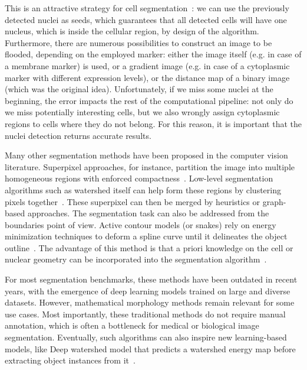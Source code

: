 This is an attractive strategy for cell segmentation~\cite{Wahlby2002}: we can use the previously detected nuclei as seeds, which guarantees that all detected cells will have one nucleus, which is inside the cellular region, by design of the algorithm. Furthermore, there are numerous possibilities to construct an image to be flooded, depending on the employed marker: either the image itself (e.g. in case of a membrane marker) is used, or a gradient image (e.g. in case of a cytoplasmic marker with different expression levels), or the distance map of a binary image (which was the original idea). 
Unfortunately, if we miss some nuclei at the beginning, the error impacts the rest of the computational pipeline: not only do we miss potentially interesting cells, but we also wrongly assign cytoplasmic regions to cells where they do not belong.
For this reason, it is important that the nuclei detection returns accurate results.

Many other segmentation methods have been proposed in the computer vision literature.
Superpixel approaches, for instance, partition the image into multiple homogeneous regions with enforced compactness~\cite{Ren_2003}.
Low-level segmentation algorithms such as watershed itself can help form these regions by clustering pixels together~\cite{Machairas_2014}.
These superpixel can then be merged by heuristics or graph-based approaches. 
The segmentation task can also be addressed from the boundaries point of view.
Active contour models (or snakes) rely on energy minimization techniques to deform a spline curve until it delineates the object outline~\cite{kass_snakes_1988}. The advantage of this method is that a priori knowledge on the cell or nuclear geometry can be incorporated into the segmentation algorithm~\cite{Dufour2005}. 


For most segmentation benchmarks, these methods have been outdated in recent years, with the emergence of deep learning models trained on large and diverse datasets.
However, mathematical morphology methods remain relevant for some use cases.
Most importantly, these traditional methods do not require manual annotation, which is often a bottleneck for medical or biological image segmentation.
Eventually, such algorithms can also inspire new learning-based models, like Deep watershed model that predicts a watershed energy map before extracting object instances from it~\cite{Bai_2017_CVPR}.

